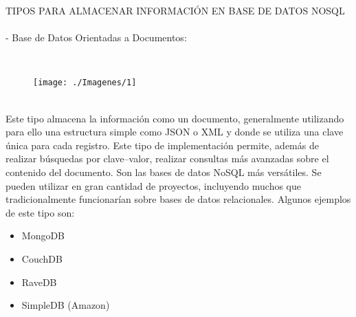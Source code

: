 \documentclass[%
 reprint,
 amsmath,amssymb,
 aps,
]{revtex4-1}
\begin{document}
           \par TIPOS PARA ALMACENAR INFORMACIÓN EN BASE DE DATOS NOSQL
\\        
\\  

  -  Base de Datos Orientadas a Documentos:
  
\\
           \begin{figure}[htb]
	\begin{center}
	\texttt{[image: ./Imagenes/1]}
	\end{center}
	\end{figure}
\\
 Este tipo almacena la información como un documento, generalmente utilizando para ello una estructura simple como JSON o XML y donde se utiliza una clave única para cada registro. Este tipo de implementación permite, además de realizar búsquedas por clave–valor, realizar consultas más avanzadas sobre el contenido del documento.  
Son las bases de datos NoSQL más versátiles. Se pueden utilizar en gran cantidad de proyectos, incluyendo muchos que tradicionalmente funcionarían sobre bases de datos relacionales. \cite{TiposNoSQL}
Algunos ejemplos de este tipo son:
           \begin{itemize}
		\item MongoDB
		\item CouchDB
		\item RaveDB
		\item SimpleDB (Amazon)
	\end{itemize}
\end{document}
